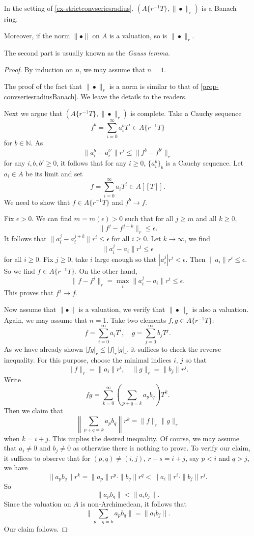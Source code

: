 \begin{proposition}\label{prop-strictconvseriesradiusBanach}
    In the setting of \cref{ex-strictconvseriesradius}, $(A\{ r^{-1}T \}  ,\|\bullet\|_r)$ is a Banach ring.

    Moreover, if the norm $\|\bullet\|$ on $A$ is a valuation, so is $\|\bullet\|_r$.
\end{proposition}
The second part is usually known as the \emph{Gauss lemma}.
\begin{proof}
    By induction on $n$, we may assume that $n=1$.

    The proof of the fact that $\|\bullet\|_r$ is a norm is similar to that of \cref{prop-convseriesradiusBanach}. We leave the details to the readers.

    Next we argue that $(A\{ r^{-1}T \}  ,\|\bullet\|_r)$  is complete. 
    Take a Cauchy sequence 
    \[
        f^b=\sum_{i=0}^{\infty}a^b_i T^i\in A\{ r^{-1}T \}
    \]
    for $b\in \mathbb{N}$. As 
    \[
        \|a^b_i-a^{b'}_i\|r^i\leq \|f^b-f^{b'}\|_r
    \]
    for any $i,b,b'\geq 0$, it follows that for any $i\geq 0$, $\{a^b_i\}_b$ is a Cauchy sequence. Let $a_i\in A$ be its limit and set 
    \[
        f=\sum_{i=0}^{\infty}a_i T^i\in A[[T]].
    \]
    We need to show that $f\in A\{ r^{-1}T \}$ and $f^b\to f$.
    
    Fix $\epsilon>0$. We can find $m=m(\epsilon)>0$ such that for all $j\geq m$ and all $k\geq 0$, 
    \[
      \|f^j-f^{j+k}\|_r\leq \epsilon.  
    \]
    It follows that $\|a^j_i-a^{j+k}_i\|r^i\leq \epsilon$ for all $i\geq 0$. Let $k\to\infty$, we find
    \[
        \|a^j_i-a_i\|r^i\leq \epsilon
    \]
    for all $i\geq 0$. Fix $j\geq 0$, take $i$ large enough so that $|a^j_i|r^i<\epsilon$. Then $\|a_i\|r^i\leq \epsilon$. So we find $f\in A\{r^{-1}T\}$. On the other hand,
    \[
         \|f-f^j\|_r=\max_{i} \|a^j_i-a_i\|r^i\leq \epsilon.  
    \]
    This proves that $f^j\to f$.

    Now assume that $\|\bullet\|$ is a valuation, we verify that $\|\bullet\|_r$ is also a valuation. Again, we may assume that $n=1$. Take two elements $f,g\in A\{r^{-1}T\}$:
    \[
        f=\sum_{i=0}^{\infty}a_i T^i,\quad g=\sum_{j=0}^{\infty}b_j T^j.
    \]
    As we have already shown $|fg|_r\leq |f|_r|g|_r$, it suffices to check the reverse inequality. For this purpose, choose the minimal indices $i$, $j$ so that
    \[
        \|f\|_r=\|a_i\|r^i,\quad \|g\|_r=\|b_j\|r^j.  
    \]
    Write
    \[
        fg=\sum_{k=0}^{\infty} \left(\sum_{p+q=k}a_pb_q  \right)T^k.
    \]
    Then we claim that
    \[
        \left\|\sum_{p+q=k}a_pb_q\right\| r^k =  \|f\|_r \|g\|_r
    \] 
    when $k=i+j$.
    This implies the desired inequality.  Of course, we may assume that $a_i\neq 0$ and $b_j\neq 0$ as otherwise there is nothing to prove.
    To verify our claim, it suffices to observe that for $(p,q)\neq (i,j)$, $r+s=i+j$, say $p<i$ and $q>j$, we have
    \[
        \|a_p b_q\|r^k=\|a_p\|r^p\cdot \|b_q\|r^q<\|a_i\|r^i\cdot \|b_j\|r^j.
    \]
    So 
    \[
        \|a_p b_q\|< \|a_i b_j\|.
    \]
    Since the valuation on $A$ is non-Archimedean, it follows that 
    \[
        \|\sum_{p+q=k}a_pb_q\|=\|a_ib_j\|.  
    \]
    Our claim follows.
\end{proof}

